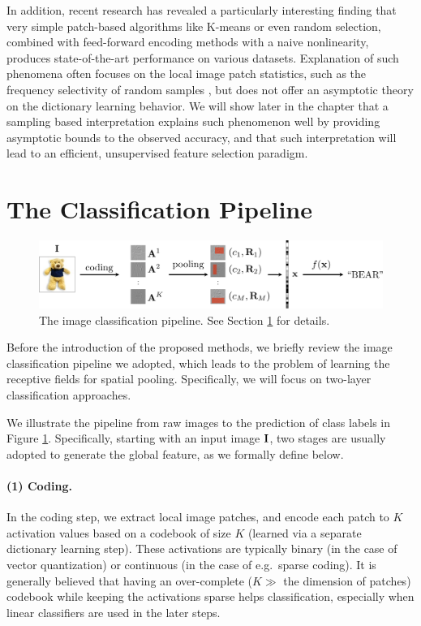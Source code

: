 In addition, recent research has revealed a particularly interesting finding \cite{coates2010aistats, Rigamonti:2011uc, coates2011icml, saxe2011random} that very simple patch-based algorithms like K-means or even random selection, combined with feed-forward encoding methods with a naive nonlinearity, produces state-of-the-art performance on various datasets. Explanation of such phenomena often focuses on the local image patch statistics, such as the frequency selectivity of random samples \cite{saxe2011random}, but does not offer an asymptotic theory on the dictionary learning behavior. We will show later in the chapter that a \nystrom sampling based interpretation explains such phenomenon well by providing asymptotic bounds to the observed accuracy, and that such interpretation will lead to an efficient, unsupervised feature selection paradigm.

\section{The Classification Pipeline}\label{sec:pipeline}

\begin{figure}[t]
  \centering
  \includegraphics[width=1.\textwidth]{figs/smartpooling/pipeline_cvpr.pdf}
  \caption{The image classification pipeline. See Section \ref{sec:pipeline} for details.}\label{fig:pipeline}
  \vspace{-0.15in}
\end{figure}

Before the introduction of the proposed methods, we briefly review the image classification pipeline we adopted, which leads to the problem of learning the receptive fields for spatial pooling. Specifically, we will focus on two-layer classification approaches.

We illustrate the pipeline from raw images to the prediction of class labels in Figure \ref{fig:pipeline}. Specifically, starting with an input image $\mathbf{I}$, two stages are usually adopted to generate the global feature, as we formally define below.

\paragraph{(1) Coding.} In the coding step, we extract local image patches, and encode each patch to $K$ activation values based on a codebook of size $K$ (learned via a separate dictionary learning step). These activations are typically binary (in the case of vector quantization) or continuous (in the case of e.g.\ sparse coding). It is generally believed that having an over-complete ($K \gg$ the dimension of patches) codebook while keeping the activations sparse helps classification, especially when linear classifiers are used in the later steps.

